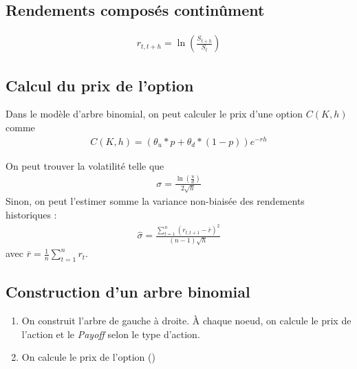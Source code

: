 \documentclass[10pt, french]{article}
\begin{document}
\begin{multicols*}{2}
\subsection*{Rendements composés continûment}
\begin{align*}
	r_{t,t+h} = \ln \left( \frac{S_{t+h}}{S_t} \right)
\end{align*}


\subsection*{Calcul du prix de l'option}
Dans le modèle d'arbre binomial, on peut calculer le prix d'une option $C(K,h)$ comme
\begin{align*}
	C(K,h) = (\theta_u * p + \theta_d * (1-p)) e^{-rh}
\end{align*}



On peut trouver la volatilité telle que
\begin{align*}
	\sigma = \frac{\ln \left( \frac{u}{d} \right)}{2 \sqrt{h}}
\end{align*}
Sinon, on peut l'estimer somme la variance non-biaisée des rendements historiques :
\begin{align*}
	\hat{\sigma} = \frac{\sum_{t=1}^{n} (r_{t, t+1} - \bar{r})^2}{(n-1)\sqrt{h}}
\end{align*}
avec $\bar{r} = \frac{1}{n} \sum_{t=1}^n r_t$.

\subsection{Construction d'un arbre binomial}
\begin{enumerate}
	\item On construit l'arbre de gauche à droite. À chaque noeud, on calcule le prix de l'action et le \emph{Payoff} selon le type d'action.
	\item On calcule le prix de l'option ()
\end{enumerate}















\end{multicols*}

\end{document}
